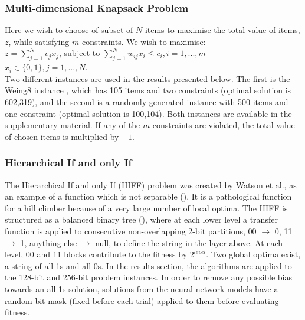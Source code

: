 \documentclass[twoside]{article}
\begin{document}
\subsubsection{Multi-dimensional Knapsack Problem}
Here we wish to choose of subset of \(N\) items to maximise the total value of items, \(z\), while satisfying \(m\) constraints. We wish to maximise:
\vspace{2mm}\\
\(z = \sum_{j=1}^{N} v_jx_j\), subject to \(\sum_{j=1}^{N} w_{ij}x_i \leq c_i, i = 1, ..., m\)
\vspace{2mm}\\
\(x_i \in \{0,1\}, j = 1, ..., N\).
\vspace{2mm}\\
Two different instances are used in the results presented below. The first is the Weing8 instance \cite{weingartner1967methods}, which has 105 items and two constraints (optimal solution is 602,319), and the second is a randomly generated instance with 500 items and one constraint (optimal solution is 100,104). Both instances are available in the supplementary material. If any of the \(m\) constraints are violated, the total value of chosen items is multiplied by \(-1\).
\subsubsection{Hierarchical If and only If}
The Hierarchical If and only If (HIFF) problem was created by Watson et al., as an example of a function which is not separable (\cite{watson1999hierarchically}). It is a pathological function for a hill climber because of a very large number of local optima. The HIFF is structured as a balanced binary tree (\cite{hboa}), where at each lower level a transfer function is applied to consecutive non-overlapping 2-bit partitions, 00 \(\rightarrow\) 0, 11 \(\rightarrow\) 1, anything else \(\rightarrow\) null, to define the string in the layer above. At each level, 00 and 11 blocks contribute to the fitness by \(2^{level}\). Two global optima exist, a string of all 1s and all 0s. In the results section, the algorithms are applied to the 128-bit and 256-bit problem instances. In order to remove any possible bias towards an all 1s solution, solutions from the neural network models have a random bit mask (fixed before each trial) applied to them before evaluating fitness.
\end{document}
